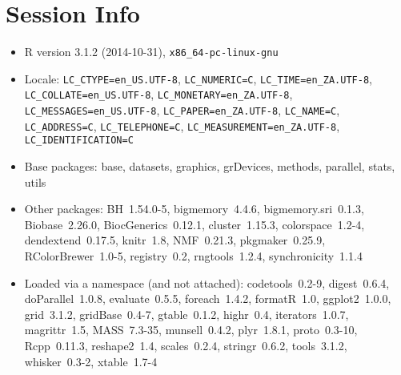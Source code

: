 \documentclass[a4paper]{article}\usepackage[]{graphicx}\usepackage[]{color}
\begin{document}
\section{Session Info}
\begin{itemize}\raggedright
  \item R version 3.1.2 (2014-10-31), \verb|x86_64-pc-linux-gnu|
  \item Locale: \verb|LC_CTYPE=en_US.UTF-8|, \verb|LC_NUMERIC=C|, \verb|LC_TIME=en_ZA.UTF-8|, \verb|LC_COLLATE=en_US.UTF-8|, \verb|LC_MONETARY=en_ZA.UTF-8|, \verb|LC_MESSAGES=en_US.UTF-8|, \verb|LC_PAPER=en_ZA.UTF-8|, \verb|LC_NAME=C|, \verb|LC_ADDRESS=C|, \verb|LC_TELEPHONE=C|, \verb|LC_MEASUREMENT=en_ZA.UTF-8|, \verb|LC_IDENTIFICATION=C|
  \item Base packages: base, datasets, graphics, grDevices,
    methods, parallel, stats, utils
  \item Other packages: BH~1.54.0-5, bigmemory~4.4.6,
    bigmemory.sri~0.1.3, Biobase~2.26.0, BiocGenerics~0.12.1,
    cluster~1.15.3, colorspace~1.2-4, dendextend~0.17.5,
    knitr~1.8, NMF~0.21.3, pkgmaker~0.25.9, RColorBrewer~1.0-5,
    registry~0.2, rngtools~1.2.4, synchronicity~1.1.4
  \item Loaded via a namespace (and not attached):
    codetools~0.2-9, digest~0.6.4, doParallel~1.0.8,
    evaluate~0.5.5, foreach~1.4.2, formatR~1.0, ggplot2~1.0.0,
    grid~3.1.2, gridBase~0.4-7, gtable~0.1.2, highr~0.4,
    iterators~1.0.7, magrittr~1.5, MASS~7.3-35, munsell~0.4.2,
    plyr~1.8.1, proto~0.3-10, Rcpp~0.11.3, reshape2~1.4,
    scales~0.2.4, stringr~0.6.2, tools~3.1.2, whisker~0.3-2,
    xtable~1.7-4
\end{itemize}


\printbibliography[heading=bibintoc]
\end{document}
